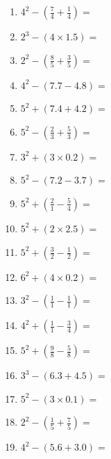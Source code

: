 \documentclass[12pt]{article}
\begin{document}
\begin{enumerate}
\newpage
\item \large $ 4^{2} - (\frac{7}{4} + \frac{1}{4}) = $ \vspace{1.4cm}
\item \large $ 2^{3} - (4 \times 1.5) = $ \vspace{1.4cm}
\item \large $ 2^{2} - (\frac{8}{5} + \frac{3}{5}) = $ \vspace{1.4cm}
\item \large $ 4^{2} - (7.7 - 4.8) = $ \vspace{1.4cm}
\item \large $ 5^{2} + (7.4 + 4.2) = $ \vspace{1.4cm}
\item \large $ 5^{2} - (\frac{2}{3} + \frac{5}{3}) = $ \vspace{1.4cm}
\item \large $ 3^{2} + (3 \times 0.2) = $ \vspace{1.4cm}
\item \large $ 5^{2} - (7.2 - 3.7) = $ \vspace{1.4cm}
\item \large $ 5^{2} + (\frac{2}{1} - \frac{5}{4}) = $ \vspace{1.4cm}
\item \large $ 5^{2} + (2 \times 2.5) = $ \vspace{1.4cm}
\newpage
\item \large $ 5^{2} + (\frac{3}{2} - \frac{1}{2}) = $ \vspace{1.4cm}
\item \large $ 6^{2} + (4 \times 0.2) = $ \vspace{1.4cm}
\item \large $ 3^{2} - (\frac{1}{1} - \frac{1}{1}) = $ \vspace{1.4cm}
\item \large $ 4^{2} + (\frac{1}{1} - \frac{3}{4}) = $ \vspace{1.4cm}
\item \large $ 5^{2} + (\frac{9}{8} - \frac{5}{8}) = $ \vspace{1.4cm}
\item \large $ 3^{3} - (6.3 + 4.5) = $ \vspace{1.4cm}
\item \large $ 5^{2} - (3 \times 0.1) = $ \vspace{1.4cm}
\item \large $ 2^{2} - (\frac{1}{5} + \frac{7}{5}) = $ \vspace{1.4cm}
\item \large $ 4^{2} - (5.6 + 3.0) = $ \vspace{1.4cm}

\end{enumerate}
\end{document}
